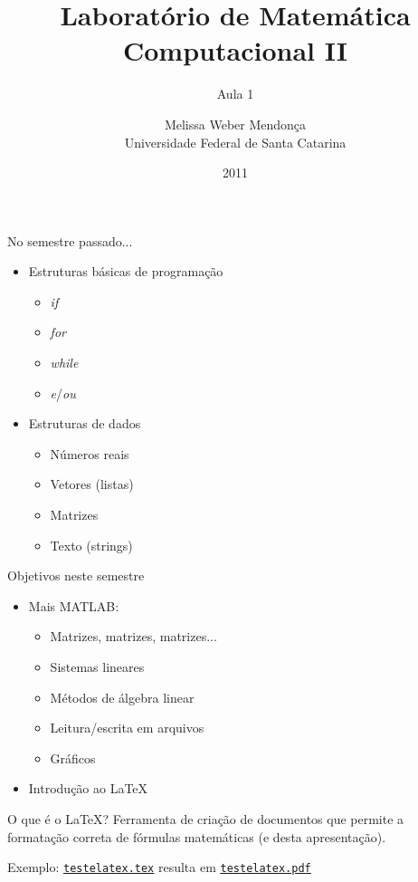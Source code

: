 \documentclass[hyperref={pdfpagelabels=false}]{beamer}
\title{Laboratório de Matemática Computacional II}
\subtitle{Aula 1}
\author[M. Weber Mendonça]{Melissa Weber Mendonça\\
Universidade Federal de Santa Catarina}
\date{2011}
\begin{document}
\setmonofont{Inconsolata}

\begin{frame}
  \titlepage
\end{frame}

\begin{frame}{No semestre passado...}
  \begin{itemize}
  \item Estruturas básicas de programação 
    \begin{itemize}
		\item \emph{if}
		\item \emph{for}
		\item \emph{while}
		\item \emph{e}/\emph{ou}
		\end{itemize}
	\item Estruturas de dados
		\begin{itemize}
		\item Números reais
		\item Vetores (listas)
		\item Matrizes
		\item Texto (strings)
		\end{itemize}
  \end{itemize}
\end{frame}

\begin{frame}{Objetivos neste semestre}
  \begin{itemize}
  \item Mais MATLAB: 
    \begin{itemize}
		\item Matrizes, matrizes, matrizes...
		\item Sistemas lineares
		\item Métodos de álgebra linear
		\item Leitura/escrita em arquivos
		\item Gráficos
		\end{itemize}
  \item Introdução ao \LaTeX 
  \end{itemize}
\end{frame}

\begin{frame}{O que é o \LaTeX?}
  Ferramenta de criação de documentos que permite a formatação correta de fórmulas matemáticas (e desta apresentação).

  Exemplo: \href{listings/testelatex.tex}{\underline{\texttt{testelatex.tex}}} resulta em \href{listings/testelatex.pdf}{\underline{\texttt{testelatex.pdf}}}
\end{frame}
\end{document}
